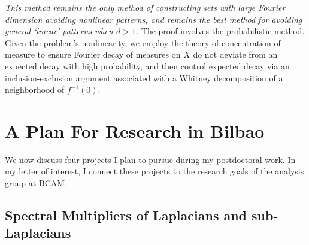 \documentclass[11pt]{article}
\theoremstyle{definition}
\begin{document}
\emph{This method remains the only method of constructing sets with large Fourier dimension avoiding nonlinear patterns, and remains the best method for avoiding general `linear' patterns when $d > 1$.} The proof involves the probabilistic method. Given the problem's nonlinearity, we employ the theory of concentration of measure to ensure Fourier decay of measures on $X$ do not deviate from an expected decay with high probability, and then control expected decay via an inclusion-exclusion argument associated with a Whitney decomposition of a neighborhood of $f^{-1}(0)$.

\section*{A Plan For Research in Bilbao}

We now discuss four projects I plan to pursue during my postdoctoral work. In my letter of interest, I connect these projects to the research goals of the analysis group at BCAM.

\subsection*{Spectral Multipliers of Laplacians and sub-Laplacians}
\end{document}
